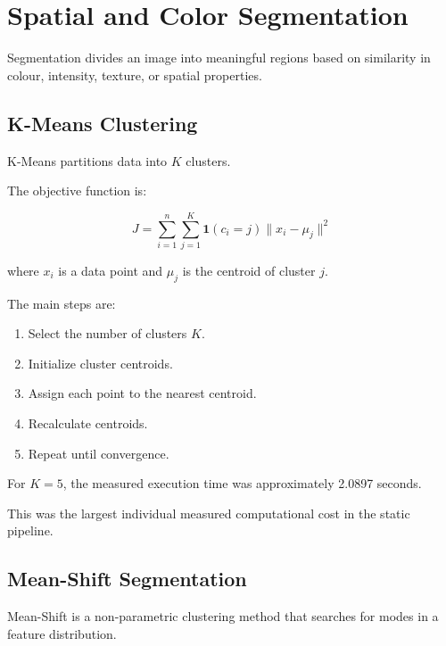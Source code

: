 \documentclass[11pt,a4paper]{article}
\begin{document}
\section{Spatial and Color Segmentation}

Segmentation divides an image into meaningful regions based on similarity in colour, intensity, texture, or spatial properties.


\subsection{K-Means Clustering}

K-Means partitions data into $K$ clusters.

The objective function is:

\begin{equation}
J=
\sum_{i=1}^{n}
\sum_{j=1}^{K}
\mathbf{1}(c_i=j)
\|x_i-\mu_j\|^2
\end{equation}

where $x_i$ is a data point and $\mu_j$ is the centroid of cluster $j$.

The main steps are:

\begin{enumerate}
    \item Select the number of clusters $K$.
    \item Initialize cluster centroids.
    \item Assign each point to the nearest centroid.
    \item Recalculate centroids.
    \item Repeat until convergence.
\end{enumerate}

For $K=5$, the measured execution time was approximately 2.0897 seconds.

This was the largest individual measured computational cost in the static pipeline.


\subsection{Mean-Shift Segmentation}

Mean-Shift is a non-parametric clustering method that searches for modes in a feature distribution.
\end{document}
